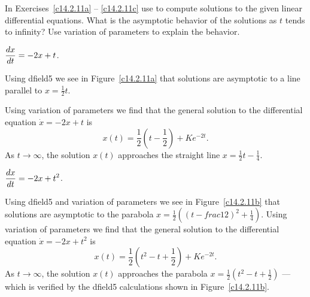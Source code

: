 \documentclass{ximera}
\begin{document}
\noindent In Exercises~\ref{c14.2.11a} -- \ref{c14.2.11c} use 
{\dfield} 
to compute solutions to the given linear differential equations.  What is 
the asymptotic behavior of the solutions as $t$ tends to infinity?  Use 
variation of parameters to explain the behavior.
\begin{computerExercise}   \label{c14.2.11a}
$\displaystyle\frac{dx}{dt} = -2 x + t$.

\begin{solution}
Using {\sf dfield5} we see in Figure~\ref{c14.2.11a} that
solutions are asymptotic to a line parallel to $x=\frac{1}{2}t$.

\begin{figure}[htb]
     \centerline{%
     }
\end{figure} 
Using variation of parameters we find that the general solution to the
differential equation $\dot{x}=-2x+t$ is 
\[
x(t) = \frac{1}{2}\left(t-\frac{1}{2}\right) +Ke^{-2t}.
\]
As $t\to\infty$, the solution $x(t)$ approaches the straight line 
$x= \frac{1}{2}t-\frac{1}{4}$.

\end{solution}
\end{computerExercise}
\begin{computerExercise}   \label{c14.2.11b}
$\displaystyle\frac{dx}{dt} = -2 x + t^2$.

\begin{solution}
Using {\sf dfield5} and variation of parameters we see in 
Figure~\ref{c14.2.11b} that solutions are asymptotic to the
parabola $x=\frac{1}{2}((t-frac{1}{2})^2+\frac{1}{4})$.
Using variation of parameters we find that the general solution to the
differential equation $\dot{x}=-2x+t^2$ is 
\[
x(t) = \frac{1}{2}\left(t^2-t+\frac{1}{2}\right) + Ke^{-2t}.
\]
As $t\to\infty$, the solution $x(t)$ approaches the parabola  
$x= \frac{1}{2}(t^2-t+\frac{1}{2})$ --- which is verified by the 
{\sf dfield5} calculations shown in Figure~\ref{c14.2.11b}.

\begin{figure}[htb]
     \centerline{%
     }
\end{figure} 

\end{solution}
\end{computerExercise}
\end{document}
